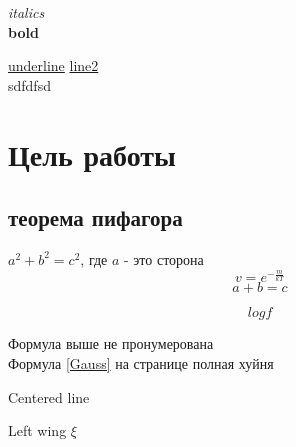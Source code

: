 \documentclass[a4paper,12pt]{article}
\begin{document}
\textit{italics}\\
\textbf{bold}

\underline{underline} \hspace{2cm} \underline{line2}\\
\vspace{3cm}
sdfdfsd
\section{Цель работы}
\subsection{теорема пифагора}
$a^2 + b^2 = c^2$, где $a$ - это сторона
$$v = e^{-\frac{m}{kT}}$$
\begin{equation}\label{Gauss}
a+b=c
\end{equation}

\begin{equation*}
logf
\end{equation*}

Формула выше не пронумерована\\
Формула \eqref{Gauss} на странице \pageref{Gauss} полная хуйня\\
\begin{center}
Centered line
\end{center}

\begin{flushleft}
Left wing $\xi$
\end{flushleft}
\end{document}
